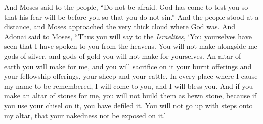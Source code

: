 \begin{biblechapter}
\verse And Moses said to the people, “Do not be afraid. God has come to test you so that his fear will be before you so that you do not sin.”
\verse And the people stood at a distance, and Moses approached the very thick cloud where God was.
 And Adonai said to Moses, “Thus you will say to the \textit{Israelites}, ‘You yourselves have seen that I have spoken to you from the heavens.
\verse You will not make alongside me gods of silver, and gods of gold you will not make for yourselves.
\verse An altar of earth you will make for me, and you will sacrifice on it your burnt offerings and your fellowship offerings, your sheep and your cattle. In every place where I cause my name to be remembered, I will come to you, and I will bless you.
\verse And if you make an altar of stones for me, you will not build them as hewn stone, because if you use your chisel on it, you have defiled it.
\verse You will not go up with steps onto my altar, that your nakedness not be exposed on it.’
\end{biblechapter}

